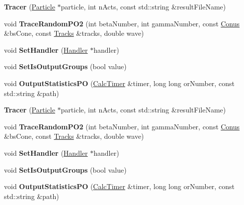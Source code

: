 \begin{DoxyCompactItemize}
\item 
\mbox{\label{class_tracer_ac11f0a7aad59fe661a3f351eecfca756}} 
{\bfseries Tracer} (\mbox{\hyperlink{class_particle}{Particle}} $\ast$particle, int n\+Acts, const std\+::string \&result\+File\+Name)
\item 
\mbox{\label{class_tracer_aacf21b3b3123155380f9d77ed643c2c8}} 
void {\bfseries Trace\+Random\+P\+O2} (int beta\+Number, int gamma\+Number, const \mbox{\hyperlink{struct_conus}{Conus}} \&bs\+Cone, const \mbox{\hyperlink{class_tracks}{Tracks}} \&tracks, double wave)
\item 
\mbox{\label{class_tracer_a7c7f40458880967ff1cd9ca8e265eeaa}} 
void {\bfseries Set\+Handler} (\mbox{\hyperlink{class_handler}{Handler}} $\ast$handler)
\item 
\mbox{\label{class_tracer_ac78ce79d165b541348b8eb250a325e38}} 
void {\bfseries Set\+Is\+Output\+Groups} (bool value)
\item 
\mbox{\label{class_tracer_a85c4978cd9b9d38ee25d489f9358e2bc}} 
void {\bfseries Output\+Statistics\+PO} (\mbox{\hyperlink{class_calc_timer}{Calc\+Timer}} \&timer, long long or\+Number, const std\+::string \&path)
\item 
\mbox{\label{class_tracer_ac11f0a7aad59fe661a3f351eecfca756}} 
{\bfseries Tracer} (\mbox{\hyperlink{class_particle}{Particle}} $\ast$particle, int n\+Acts, const std\+::string \&result\+File\+Name)
\item 
\mbox{\label{class_tracer_aacf21b3b3123155380f9d77ed643c2c8}} 
void {\bfseries Trace\+Random\+P\+O2} (int beta\+Number, int gamma\+Number, const \mbox{\hyperlink{struct_conus}{Conus}} \&bs\+Cone, const \mbox{\hyperlink{class_tracks}{Tracks}} \&tracks, double wave)
\item 
\mbox{\label{class_tracer_a7c7f40458880967ff1cd9ca8e265eeaa}} 
void {\bfseries Set\+Handler} (\mbox{\hyperlink{class_handler}{Handler}} $\ast$handler)
\item 
\mbox{\label{class_tracer_ac78ce79d165b541348b8eb250a325e38}} 
void {\bfseries Set\+Is\+Output\+Groups} (bool value)
\item 
\mbox{\label{class_tracer_a85c4978cd9b9d38ee25d489f9358e2bc}} 
void {\bfseries Output\+Statistics\+PO} (\mbox{\hyperlink{class_calc_timer}{Calc\+Timer}} \&timer, long long or\+Number, const std\+::string \&path)
\end{DoxyCompactItemize}
